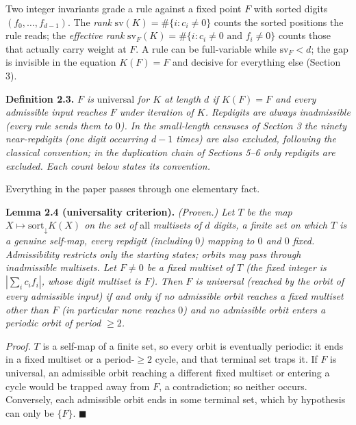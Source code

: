 \documentclass[11pt,letterpaper]{article}
\theoremstyle{paperstyle}
\theoremstyle{paperstyledef}
\theoremstyle{paperstylerem}
\begin{document}
Two integer invariants grade a rule against a fixed point \(F\) with sorted digits \((f_0, \dots, f_{d-1})\). The \emph{rank} \(\mathrm{sv}(K) = \#\{i : c_i \neq 0\}\) counts the sorted positions the rule reads; the \emph{effective rank} \(\mathrm{sv}_F(K) = \#\{i : c_i \neq 0 \text{ and } f_i \neq 0\}\) counts those that actually carry weight at \(F\). A rule can be full-variable while \(\mathrm{sv}_F < d\); the gap is invisible in the equation \(K(F) = F\) and decisive for everything else (Section 3).

\textbf{Definition 2.3.} \emph{\(F\) is} universal \emph{for \(K\) at length \(d\) if \(K(F) = F\) and every admissible input reaches \(F\) under iteration of \(K\). Repdigits are always inadmissible (every rule sends them to \(0\)). In the small-length censuses of Section 3 the ninety near-repdigits (one digit occurring \(d-1\) times) are also excluded, following the classical convention; in the duplication chain of Sections 5--6 only repdigits are excluded. Each count below states its convention.}

Everything in the paper passes through one elementary fact.

\textbf{Lemma 2.4 (universality criterion).} \emph{(Proven.) Let \(T\) be the map \(X \mapsto \mathrm{sort}_\downarrow K(X)\) on the set of} all \emph{multisets of \(d\) digits, a finite set on which \(T\) is a genuine self-map, every repdigit (including \(0\)) mapping to \(0\) and \(0\) fixed. Admissibility restricts only the starting states; orbits may pass through inadmissible multisets. Let \(F \neq 0\) be a fixed multiset of \(T\) (the fixed integer is \(|\sum_i c_i f_i|\), whose digit multiset is \(F\)). Then \(F\) is universal (reached by the orbit of every admissible input) if and only if no admissible orbit reaches a fixed multiset other than \(F\) (in particular none reaches \(0\)) and no admissible orbit enters a periodic orbit of period \(\geq 2\).}

\emph{Proof.} \(T\) is a self-map of a finite set, so every orbit is eventually periodic: it ends in a fixed multiset or a period-\(\geq 2\) cycle, and that terminal set traps it. If \(F\) is universal, an admissible orbit reaching a different fixed multiset or entering a cycle would be trapped away from \(F\), a contradiction; so neither occurs. Conversely, each admissible orbit ends in some terminal set, which by hypothesis can only be \(\{F\}\). \(\blacksquare\)
\end{document}
